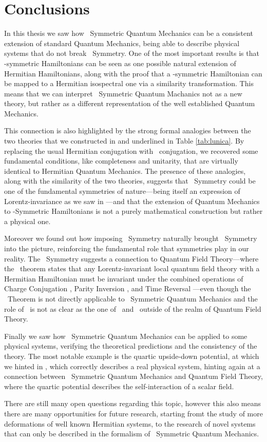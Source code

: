 \chapter{Conclusions}\label{ch:conclusions}
    In this thesis we saw how \PT\ Symmetric Quantum Mechanics can be a consistent extension of standard Quantum Mechanics, being able to describe physical systems that do not break \PT\ Symmetry. One of the most important results is that \PT-symmetric Hamiltonians can be seen as one possible natural extension of Hermitian Hamiltonians, along with the proof that a \PT-symmetric Hamiltonian can be mapped to a Hermitian isospectral one via a similarity transformation. This means that we can interpret \PT\ Symmetric Quantum Machanics not as a new theory, but rather as a different representation of the well established Quantum Mechanics.
    
    This connection is also highlighted by the strong formal analogies between the two theories that we constructed in  and underlined in Table \ref{tab:lunica}. By replacing the usual Hermitian conjugation with \CPT\ conjugation, we recovered some fundamental conditions, like completeness and unitarity, that are virtually identical to Hermitian Quantum Mechanics. The presence of these analogies, along with the similarity of the two theories, suggests that \PT\ Symmetry could be one of the fundamental symmetries of nature---being itself an expression of Lorentz-invariance as we saw in ---and that the extension of Quantum Mechanics to \PT-Symmetric Hamiltonians is not a purely mathematical construction but rather a physical one.

    Moreover we found out how imposing \PT\ Symmetry naturally brought \CPT\ Symmetry into the picture, reinforcing the fundamental role that symmetries play in our reality. The \CPT\ Symmetry suggests a connection to Quantum Field Theory---where the \CPT\ theorem states that any Lorentz-invariant local quantum field theory with a Hermitian Hamiltonian must be invariant under the combined operations of Charge Conjugation \hC, Parity Inversion \hP, and Time Reversal \hT---even though the \CPT\ Theorem is not directly applicable to \PT\ Symmetric Quantum Mechanics and the role of \hC\ is not as clear as the one of \hP\ and \hT\ outside of the realm of Quantum Field Theory.

    Finally we saw how \PT\ Symmetric Quantum Mechanics can be applied to some physical systems, verifying the theoretical predictions and the consistency of the theory. The most notable example is the quartic upside-down potential, at which we hinted in , which correctly describes a real physical system, hinting again at a connection between \PT\ Symmetric Quantum Mechanics and Quantum Field Theory, where the quartic potential describes the self-interaction of a scalar field.

    There are still many open questions regarding this topic, however this also means there are many opportunities for future research, starting fromt the study of more deformations of well known Hermitian systems, to the research of novel systems that can only be described in the formalism of \PT\ Symmetric Quantum Mechanics.